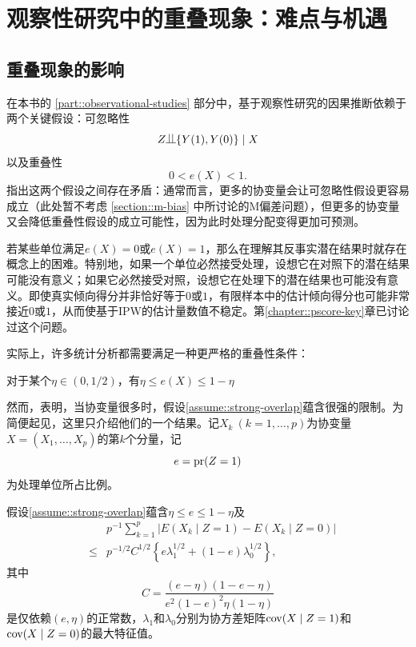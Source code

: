 
\chapter{观察性研究中的重叠现象：难点与机遇}
  \label{chapter::overlap}


 
\section{重叠现象的影响}

在本书的 \ref{part::observational-studies} 部分中，基于观察性研究的因果推断依赖于两个关键假设：可忽略性  
$$
Z\ind \{ Y(1), Y(0)  \} \mid X
$$
以及重叠性  
 $$
 0 <  e(X) <  1 .
 $$ 
 \citet{d2017overlap} 指出这两个假设之间存在矛盾：通常而言，更多的协变量会让可忽略性假设更容易成立（此处暂不考虑 \ref{section::m-bias} 中所讨论的M偏差问题），但更多的协变量又会降低重叠性假设的成立可能性，因为此时处理分配变得更加可预测。

若某些单位满足$e(X) = 0$或$e(X) = 1$，那么在理解其反事实潜在结果时就存在概念上的困难\citep{king2006dangers}。特别地，如果一个单位必然接受处理，设想它在对照下的潜在结果可能没有意义；如果它必然接受对照，设想它在处理下的潜在结果也可能没有意义。即使真实倾向得分并非恰好等于$0$或$1$，有限样本中的估计倾向得分也可能非常接近$0$或$1$，从而使基于IPW的估计量数值不稳定。第\ref{chapter::pscore-key}章已讨论过这个问题。 


实际上，许多统计分析都需要满足一种更严格的重叠性条件：

\begin{assumption}
[严格重叠性]
\label{assume::strong-overlap}
对于某个$\eta \in (0,1/2)$，有$\eta \leq e(X) \leq 1-\eta$
\end{assumption}


然而，\citet[][Corollary 1]{d2017overlap}表明，当协变量很多时，假设\ref{assume::strong-overlap}蕴含很强的限制。为简便起见，这里只介绍他们的一个结果。记$X_k\ (k=1,\ldots, p)$为协变量$X = (X_1, \ldots, X_p)$的第$k$个分量，记$$
e= \textup{pr}(Z=1)
$$为处理单位所占比例。 


\begin{theorem}\label{thm::overlap-implications}
假设\ref{assume::strong-overlap}蕴含$\eta \leq e \leq 1-\eta$及\begin{eqnarray} 
&&p^{-1} \sum_{k=1}^p \big | E(X_k\mid Z=1) - E(X_k\mid Z=0)  \Big |   \nonumber  \\
& \leq &  
p^{-1/2} C^{1/2}  \left\{    e\lambda_1^{1/2} + (1-e)  \lambda_0^{1/2}  \right\} , \label{eq::mean-balance-overlap}
\end{eqnarray}其中$$
C  = \frac{  (e-\eta)(1-e-\eta)   }{  e^2(1-e)^2 \eta (1-\eta)      }
$$是仅依赖$(e, \eta)$的正常数，$\lambda_1$和$\lambda_0$分别为协方差矩阵$ \textup{cov}(X\mid Z=1)$和$\textup{cov}(X\mid Z=0) $的最大特征值。 
\end{theorem}

